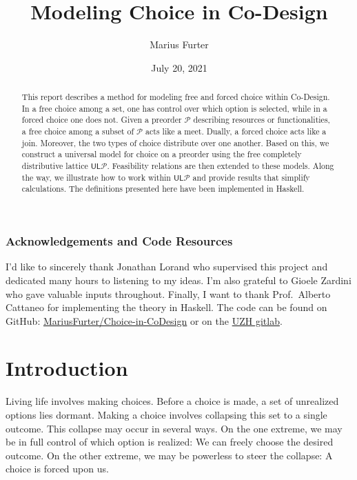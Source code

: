 \documentclass[12pt]{article}
\title{Modeling Choice in Co-Design}
\author{Marius Furter}
\date{July 20, 2021}
\theoremstyle{definition}
\theoremstyle{plain}
\theoremstyle{plain}
\theoremstyle{plain}
\theoremstyle{plain}
\theoremstyle{remark}
\theoremstyle{remark}
\newcommand{\mc}[1]{\mathcal{#1}}
\newcommand{\low}{\mathsf{L}}
\newcommand{\upper}{\mathsf{U}}
\begin{document}
\maketitle

\begin{abstract}
	This report describes a method for modeling free and forced choice within Co-Design. In a free choice among a set, one has control over which option is selected, while in a forced choice one does not. Given a preorder $\mc{P}$ describing resources or functionalities, a free choice among a subset of $\mc{P}$ acts like a meet. Dually, a forced choice acts like a join. Moreover, the two types of choice distribute over one another. Based on this, we construct a universal model for choice on a preorder using the free completely distributive lattice $\upper\low\mc{P}$. Feasibility relations are then extended to these models. Along the way, we illustrate how to work within $\upper\low\mc{P}$ and provide results that simplify calculations. The definitions presented here have been implemented in Haskell.
\end{abstract}

\vspace{3.5cm}
\subsubsection*{\centering Acknowledgements and Code Resources}
I'd like to sincerely thank Jonathan Lorand who supervised this project and dedicated many hours to listening to my ideas. I'm also grateful to Gioele Zardini who gave valuable inputs throughout. Finally, I want to thank Prof.~Alberto Cattaneo for implementing the theory in Haskell. The code can be found on GitHub: \href{https://github.com/MariusFurter/Choice-in-CoDesign}{MariusFurter/Choice-in-CoDesign} or on the \href{https://git.math.uzh.ch/asc/choice-in-codesign}{UZH gitlab}.
\newpage
\tableofcontents
\newpage

\section{Introduction}
Living life involves making choices. Before a choice is made, a set of unrealized options lies dormant. Making a choice involves collapsing this set to a single outcome. This collapse may occur in several ways. On the one extreme, we may be in full control of which option is realized: We can freely choose the desired outcome. On the other extreme, we may be powerless to steer the collapse: A choice is forced upon us.
\end{document}
